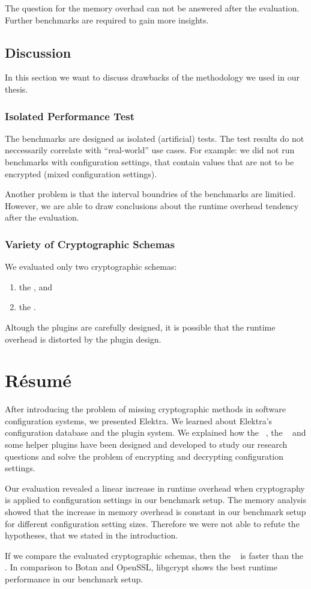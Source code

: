 The question for the memory overhad can not be answered after the evaluation.
Further benchmarks are required to gain more insights.

\section{Discussion}

In this section we want to discuss drawbacks of the methodology we used in our thesis.

	\subsection{Isolated Performance Test}

The benchmarks are designed as isolated (artificial) tests.
The test results do not neccessarily correlate with ``real-world'' use cases.
For example: we did not run benchmarks with configuration settings, that contain values that are not to be encrypted (mixed configuration settings).

Another problem is that the interval boundries of the benchmarks are limitied.
However, we are able to draw conclusions about the runtime overhead tendency after the evaluation.

	\subsection{Variety of Cryptographic Schemas}

We evaluated only two cryptographic schemas:
\begin{enumerate}
\item the \crypto, and
\item the \fcrypt.
\end{enumerate}

Altough the plugins are carefully designed, it is possible that the runtime overhead is distorted by the plugin design.

\chapter{Résumé}

After introducing the problem of missing cryptographic methods in software configuration systems, we presented Elektra.
We learned about Elektra's configuration database and the plugin system.
We explained how the \crypto~, the \fcrypt~ and some helper plugins have been designed and developed to study our research questions and solve the problem of encrypting and decrypting configuration settings.

Our evaluation revealed a linear increase in runtime overhead when cryptography is applied to configuration settings in our benchmark setup.
The memory analysis showed that the increase in memory overhead is constant in our benchmark setup for different configuration setting sizes.
Therefore we were not able to refute the hypotheses, that we stated in the introduction.

If we compare the evaluated cryptographic schemas, then the \fcrypt~ is faster than the \crypto.
In comparison to Botan and OpenSSL, libgcrypt shows the best runtime performance in our benchmark setup.
